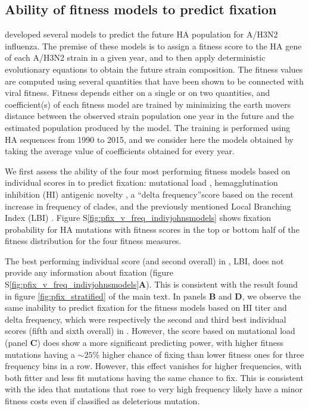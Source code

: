 \documentclass[reprint,amsmath,amssymb,superscriptaddress,showpacs,rmp]{revtex4-1}
\newcommand{\sref}[1]{S\ref{#1}}
\begin{document}

\subsection{Ability of fitness models to predict fixation} %
\label{sub:ability_of_fitness_models_to_predict_fixation}

\citet{huddleston_integrating_2020} developed several models to predict the future HA population for A/H3N2 influenza.
The premise of these models is to assign a fitness score to the HA gene of each A/H3N2 strain in a given year, and to then apply deterministic evolutionary equations to obtain the future strain composition.
The fitness values are computed using several quantities that have been shown to be connected with viral fitness.
Fitness depends either on a single or on two quantities, and coefficient(s) of each fitness model are trained by minimizing the earth movers distance between the observed strain population one year in the future and the estimated population produced by the model.
The training is performed using HA sequences from 1990 to 2015, and we consider here the models obtained by taking the average value of coefficients obtained for every year.


We first assess the ability of the four most performing fitness models based on individual scores in \citep{huddleston_integrating_2020} to predict fixation: mutational load \citep{luksza_predictive_2014}, hemagglutination inhibition (HI) antigenic novelty \citep{neher_prediction_2016}, a ``delta frequency''score based on the recent increase in frequency of clades, and the previously mentioned Local Branching Index (LBI) \citep{neher_predicting_2014}.
Figure \sref{fig:pfix_v_freq_indivjohnsmodels} shows fixation probability for HA mutations with fitness scores in the top or bottom half of the fitness distribution for the four fitness measures.

The best performing individual score (and second overall) in \citep{huddleston_integrating_2020}, LBI, does not provide any information about fixation (figure \sref{fig:pfix_v_freq_indivjohnsmodels}\textbf{A}).
This is consistent with the result found in figure \ref{fig:pfix_stratified} of the main text.
In panels \textbf{B} and \textbf{D}, we observe the same inability to predict fixation for the fitness models based on HI titer and delta frequency, which were respectively the second and third best individual scores (fifth and sixth overall) in \citep{huddleston_integrating_2020}.
However, the score based on mutational load (panel \textbf{C}) does show a more significant predicting power, with higher fitness mutations having a $\sim 25$\% higher chance of fixing than lower fitness ones for three frequency bins in a row.
However, this effect vanishes for higher frequencies, with both fitter and less fit mutations having the same chance to fix.
This is consistent with the idea that mutations that rose to very high frequency likely have a minor fitness costs even if classified as deleterious mutation.
\end{document}
